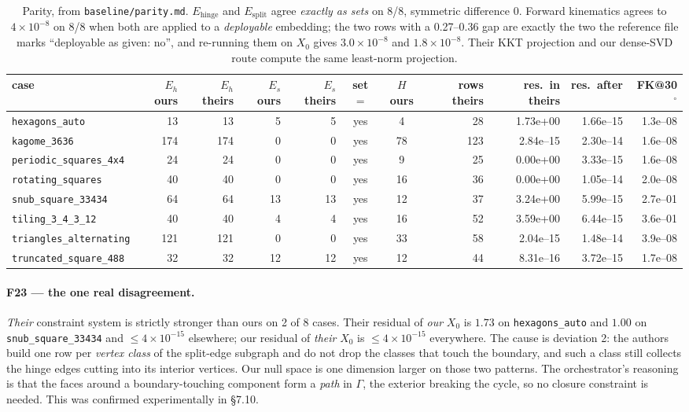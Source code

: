 \documentclass[10pt,a4paper]{article}
\newcommand{\fn}[1]{\nolinkurl{#1}}
\begin{document}
\begin{table}[h]
\centering\footnotesize
\begin{tabular}{@{}lrrrrccrrrr@{}}
\toprule
case & $E_h$ ours & $E_h$ theirs & $E_s$ ours & $E_s$ theirs & set$=$ & $H$ ours & rows theirs & res.\ in theirs & res.\ after & FK@30$^\circ$ \\
\midrule
\fn{hexagons_auto}         & 13 & 13 & 5 & 5 & yes & 4 & 28 & 1.73e+00 & 1.66e--15 & 1.3e--08 \\
\fn{kagome_3636}           & 174 & 174 & 0 & 0 & yes & 78 & 123 & 2.84e--15 & 2.30e--14 & 1.6e--08 \\
\fn{periodic_squares_4x4}  & 24 & 24 & 0 & 0 & yes & 9 & 25 & 0.00e+00 & 3.33e--15 & 1.6e--08 \\
\fn{rotating_squares}      & 40 & 40 & 0 & 0 & yes & 16 & 36 & 0.00e+00 & 1.05e--14 & 2.0e--08 \\
\fn{snub_square_33434}     & 64 & 64 & 13 & 13 & yes & 12 & 37 & 3.24e+00 & 5.99e--15 & 2.7e--01 \\
\fn{tiling_3_4_3_12}       & 40 & 40 & 4 & 4 & yes & 16 & 52 & 3.59e+00 & 6.44e--15 & 3.6e--01 \\
\fn{triangles_alternating} & 121 & 121 & 0 & 0 & yes & 33 & 58 & 2.04e--15 & 1.48e--14 & 3.9e--08 \\
\fn{truncated_square_488}  & 32 & 32 & 12 & 12 & yes & 12 & 44 & 8.31e--16 & 3.72e--15 & 1.7e--08 \\
\bottomrule
\end{tabular}
\caption{Parity, from \fn{baseline/parity.md}. $E_{\mathrm{hinge}}$ and
$E_{\mathrm{split}}$ agree \emph{exactly as sets} on 8/8, symmetric difference 0. Forward
kinematics agrees to $4\times10^{-8}$ on 8/8 when both are applied to a \emph{deployable}
embedding; the two rows with a 0.27--0.36 gap are exactly the two the reference file marks
``deployable as given: no'', and re-running them on $X_0$ gives $3.0\times10^{-8}$ and
$1.8\times10^{-8}$. Their KKT projection and our dense-SVD route compute the same least-norm
projection.}
\end{table}

\paragraph{F23 --- the one real disagreement.} \emph{Their} constraint system is strictly
stronger than ours on 2 of 8 cases. Their residual of \emph{our} $X_0$ is $1.73$ on
\fn{hexagons_auto} and $1.00$ on \fn{snub_square_33434} and $\le 4\times10^{-15}$ elsewhere;
our residual of \emph{their} $X_0$ is $\le 4\times10^{-15}$ everywhere. The cause is deviation
2: the authors build one row per \emph{vertex class} of the split-edge subgraph and do not drop
the classes that touch the boundary, and such a class still collects the hinge edges cutting
into its interior vertices. Our null space is one dimension larger on those two patterns.
The orchestrator's reasoning is that the faces around a boundary-touching component form a
\emph{path} in $\Gamma$, the exterior breaking the cycle, so no closure constraint is needed.
This was confirmed experimentally in \S7.10.
\end{document}
